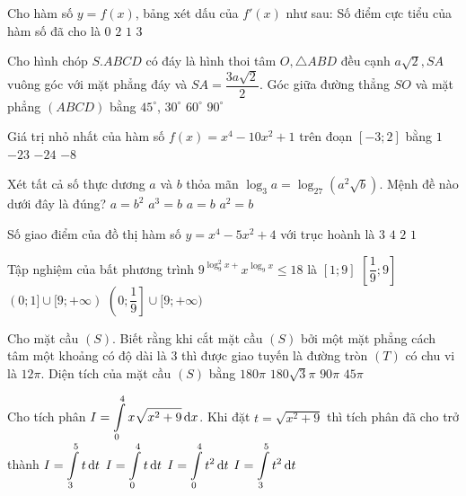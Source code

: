 \begin{ex}%
Cho hàm số $y=f(x)$, bảng xét dấu của $f'(x)$ như sau:
Số điểm cực tiểu của hàm số đã cho là
\choice
{$0$}
{\True $2$}
{$1$}
{$3$}

\end{ex}
\begin{ex}%
Cho hình chóp $S.ABCD$ có đáy là hình thoi tâm $O, \triangle ABD$ đều cạnh $a \sqrt{2}, SA$ vuông góc với mặt phẳng đáy và $SA=\dfrac{3 a \sqrt{2}}{2}$. Góc giữa đường thẳng $SO$ và mặt phẳng $(ABCD)$ bằng
\choice
{$45^{\circ}$,}
{$30^{\circ}$}
{\True $60^{\circ}$}
{$90^{\circ}$}

\end{ex}
\begin{ex}%
Giá trị nhỏ nhất của hàm số $f(x)=x^4-10 x^2+1$ trên đoạn $[-3; 2]$ bằng
\choice
{$1$}
{$-23$}
{\True $-24$}
{$-8$}

\end{ex}
\begin{ex}%
Xét tất cả số thực dương $a$ và $b$ thỏa mãn $\log_3 a=\log_{27}\left(a^2 \sqrt{b}\right)$.
Mệnh đề nào dưới đây là đúng?
\choice
{$a=b^2$}
{$a^3=b$}
{$a=b$}
{\True $a^2=b$}

\end{ex}
\begin{ex}%
Số giao điểm của đồ thị hàm số $y=x^4-5 x^2+4$ với trục hoành là
\choice
{$3$}
{\True $4$}
{$2$}
{$1$}

\end{ex}
\begin{ex}%
Tập nghiệm của bất phương trình $9^{\log_9^2 x+} x^{\log_9 x} \leq 18$ là
\choice
{$[1; 9]$}
{\True $\left[\dfrac{1}{9}; 9\right]$}
{$(0; 1] \cup[9;+\infty)$}
{$\left(0; \dfrac{1}{9}\right] \cup[9;+\infty)$}

\end{ex}
\begin{ex}%
Cho mặt cầu $(S)$. Biết rằng khi cắt mặt cầu $(S)$ bởi một mặt phẳng cách tâm một khoảng có độ dài là $3$ thì được giao tuyến là đường tròn $(T)$ có chu vi là $12\pi$. Diện tích của mặt cầu $(S)$ bằng
\choice
{\True $180\pi$}
{$180\sqrt{3} \pi$}
{$90\pi$}
{$45\pi$}

\end{ex}
\begin{ex}%
Cho tích phân $I=\displaystyle\displaystyle\int\limits_0^4 x \sqrt{x^2+9} \mathrm{\,d} x$. Khi đặt $t=\sqrt{x^2+9}$ thì tích phân đã cho trở thành
\choice
{$I=\displaystyle\displaystyle\int\limits_3^5 t \mathrm{\,d} t$}
{$I=\displaystyle\displaystyle\int\limits_0^4 t \mathrm{\,d} t$}
{$I=\displaystyle\displaystyle\int\limits_0^4 t^2 \mathrm{\,d} t$}
{\True $I=\displaystyle\displaystyle\int\limits_3^5 t^2 \mathrm{\,d} t$}

\end{ex}
